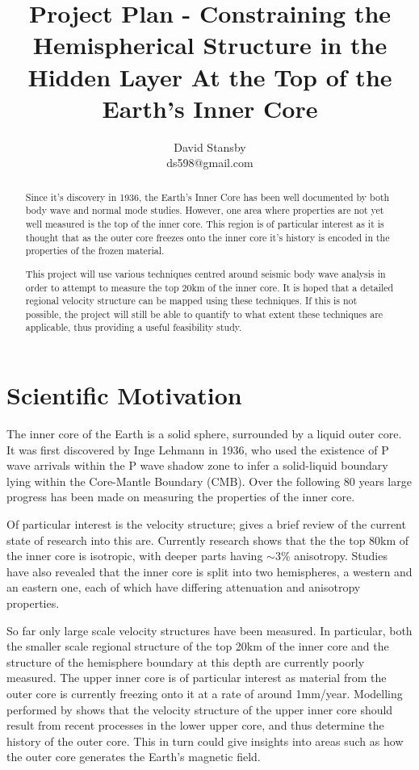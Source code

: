 \documentclass[11pt,a4paper]{article}
\begin{document}
\title{Project Plan - Constraining the Hemispherical Structure in the Hidden Layer At the Top of the Earth's Inner Core}
\author{David Stansby \\ ds598@gmail.com }
\maketitle

\begin{abstract}
Since it's discovery in 1936, the Earth's Inner Core has been well documented by both body wave and normal mode studies. However, one area where properties are not yet well measured is the top of the inner core. This region is of particular interest as it is thought that as the outer core freezes onto the inner core it's history is encoded in the properties of the frozen material.

This project will use various techniques centred around seismic body wave analysis in order to attempt to measure the top 20km of the inner core. It is hoped that a detailed regional velocity structure can be mapped using these techniques. If this is not possible, the project will still be able to quantify to what extent these techniques are applicable, thus providing a useful feasibility study.
\end{abstract}

\section{Scientific Motivation}
The inner core of the Earth is a solid sphere, surrounded by a liquid outer core. It was first discovered by Inge Lehmann in 1936, who used the existence of P wave arrivals within the P wave shadow zone to infer a solid-liquid boundary lying within the Core-Mantle Boundary (CMB). Over the following 80 years large progress has been made on measuring the properties of the inner core.

Of particular interest is the velocity structure; \cite{Deuss2014} gives a brief review of the current state of research into this are. Currently research shows that the the top 80km of the inner core is isotropic, with deeper parts having $\sim 3\% $ anisotropy. Studies have also revealed that the inner core is split into two hemispheres, a western and an eastern one, each of which have differing attenuation and anisotropy properties.

So far only large scale velocity structures have been measured. In particular, both the smaller scale regional structure of the top 20km of the inner core and the structure of the hemisphere boundary at this depth are currently poorly measured. The upper inner core is of particular interest as material from the outer core is currently freezing onto it at a rate of around 1mm/year. Modelling performed by \cite{Deguen2009a} shows that the velocity structure of the upper inner core should result from recent processes in the lower upper core, and thus determine the history of the outer core. This in turn could give insights into areas such as how the outer core generates the Earth's magnetic field.
\end{document}
